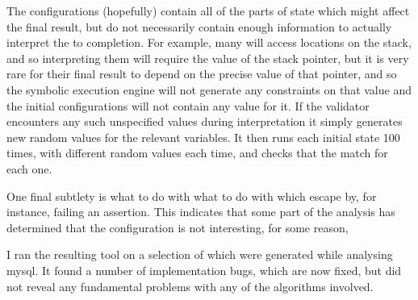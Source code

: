 The configurations (hopefully) contain all of the parts of
{\StateMachine} state which might affect the final result, but do not
necessarily contain enough information to actually interpret the
{\StateMachines} to completion.  For example, many {\StateMachines}
will access locations on the stack, and so interpreting them will
require the value of the stack pointer, but it is very rare for their
final result to depend on the precise value of that pointer, and so
the symbolic execution engine will not generate any constraints on
that value and the initial configurations will not contain any value
for it.  If the validator encounters any such unspecified values
during {\StateMachine} interpretation it simply generates new random
values for the relevant variables.  It then runs each initial state
100 times, with different random values each time, and checks that the
{\StateMachines} match for each one.

One final subtlety is what to do with what to do with {\StateMachines}
which escape by, for instance, failing an assertion.  This indicates
that some part of the analysis has determined that the configuration
is not interesting, for some reason, 

I ran the resulting tool on a selection of {\StateMachines} which were
generated while analysing mysql.  It found a number of implementation
bugs, which are now fixed, but did not reveal any fundamental problems
with any of the algorithms involved.

